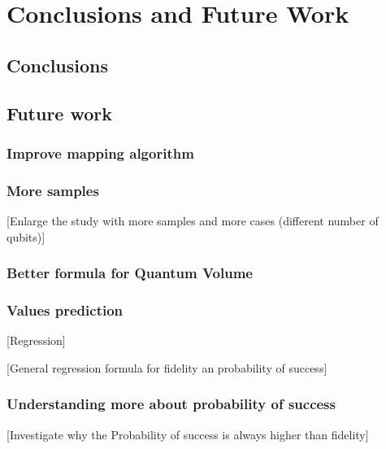 

\chapter{Conclusions and Future Work}
\label{sec:org65f694a}
\section{Conclusions}
\label{sec:org22dc041}
\section{Future work}
\label{sec:orga79cb36}

\subsection{Improve mapping algorithm}
\label{sec:org8466bcf}
\subsection{More samples}
\label{sec:orgf290e03}

[Enlarge the study with more samples and more cases (different number of qubits)]
\subsection{Better formula for Quantum Volume}
\label{sec:orged3dea1}
\subsection{Values prediction}
\label{sec:org8f2b311}

[Regression]

[General regression formula for fidelity an probability of success]

\subsection{Understanding more about probability of success}
\label{sec:org9193d42}

[Investigate why the Probability of success is always higher than fidelity]
